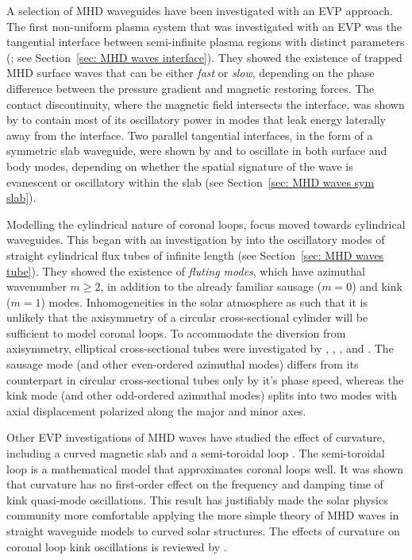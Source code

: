 A selection of MHD waveguides have been investigated with an EVP approach. The first non-uniform plasma system that was investigated with an EVP was the tangential interface between semi-infinite plasma regions with distinct parameters (\citealp{zaj_etal75,rob81a}; see Section~\ref{sec: MHD waves interface}). They showed the existence of trapped MHD surface waves that can be either \textit{fast} or \textit{slow}, depending on the phase difference between the pressure gradient and magnetic restoring forces. The contact discontinuity, where the magnetic field intersects the interface, was shown by \cite{vic_etal18} to contain most of its oscillatory power in modes that leak energy laterally away from the interface. Two parallel tangential interfaces, in the form of a symmetric slab waveguide, were shown by \cite{rob81b} and \cite{edw_etal82} to oscillate in both surface and body modes, depending on whether the spatial signature of the wave is evanescent or oscillatory within the slab (see Section~\ref{sec: MHD waves sym slab}).

Modelling the cylindrical nature of coronal loops, focus moved towards cylindrical waveguides. This began with an investigation by \cite{edw_etal83} into the oscillatory modes of straight cylindrical flux tubes of infinite length (see Section~\ref{sec: MHD waves tube}). They showed the existence of \textit{fluting modes}, which have azimuthal wavenumber $m \geq 2$, in addition to the already familiar sausage ($m = 0$) and kink ($m = 1$) modes. Inhomogeneities in the solar atmosphere as such that it is unlikely that the axisymmetry of a circular cross-sectional cylinder will be sufficient to model coronal loops. To accommodate the diversion from axisymmetry, elliptical cross-sectional tubes were investigated by \cite{gu_etal80}, \cite{rud03}, \cite{erd_etal09}, and \cite{mor_etal11}. The sausage mode (and other even-ordered azimuthal modes) differs from its counterpart in circular cross-sectional tubes only by it's phase speed, whereas the kink mode (and other odd-ordered azimuthal modes) splits into two modes with axial displacement polarized along the major and minor axes.

Other EVP investigations of MHD waves have studied the effect of curvature, including a curved magnetic slab \citep{ver_etal06a,ver_etal06b} and a semi-toroidal loop \citep{van_etal04}. The semi-toroidal loop is a mathematical model that approximates coronal loops well. It was shown that curvature has no first-order effect on the frequency and damping time of kink quasi-mode oscillations. This result has justifiably made the solar physics community more comfortable applying the more simple theory of MHD waves in straight waveguide models to curved solar structures. The effects of curvature on coronal loop kink oscillations is reviewed by \cite{van_etal09}.

